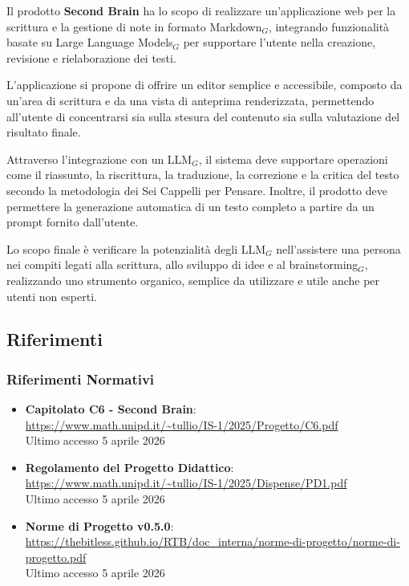 \documentclass[a4paper, 10pt, colorlinks=true, linkcolor=black, urlcolor=blue, citecolor=blue, hidelinks]{article}
\begin{document}
Il prodotto \textbf{Second Brain} ha lo scopo di realizzare un'applicazione web per la scrittura e la gestione di note in formato Markdown$_G$, integrando funzionalità basate su Large Language Models$_G$ per supportare l'utente nella creazione, revisione e rielaborazione dei testi.

L'applicazione si propone di offrire un editor semplice e accessibile, composto da un'area di scrittura e da una vista di anteprima renderizzata, permettendo all'utente di concentrarsi sia sulla stesura del contenuto sia sulla valutazione del risultato finale.

Attraverso l'integrazione con un LLM$_G$, il sistema deve supportare operazioni come il riassunto, la riscrittura, la traduzione, la correzione e la critica del testo secondo la metodologia dei Sei Cappelli per Pensare. Inoltre, il prodotto deve permettere la generazione automatica di un testo completo a partire da un prompt fornito dall'utente.

Lo scopo finale è verificare la potenzialità degli LLM$_G$ nell'assistere una persona nei compiti legati alla scrittura, allo sviluppo di idee e al brainstorming$_G$, realizzando uno strumento organico, semplice da utilizzare e utile anche per utenti non esperti.


\subsection{Riferimenti}

\subsubsection{Riferimenti Normativi}
\begin{itemize}
    \item \textbf{Capitolato C6 - Second Brain}: \\
    \url{https://www.math.unipd.it/~tullio/IS-1/2025/Progetto/C6.pdf} \\
    Ultimo accesso 5 aprile 2026

    \item \textbf{Regolamento del Progetto Didattico}: \\
    \url{https://www.math.unipd.it/~tullio/IS-1/2025/Dispense/PD1.pdf} \\
    Ultimo accesso 5 aprile 2026

    \item \textbf{Norme di Progetto v0.5.0}: \\
    \url{https://thebitless.github.io/RTB/doc_interna/norme-di-progetto/norme-di-progetto.pdf} \\
    Ultimo accesso 5 aprile 2026
\end{itemize}
\end{document}
